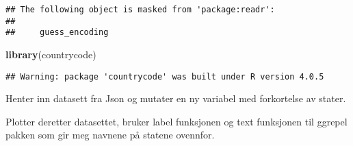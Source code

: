 \documentclass[
]{article}
\newenvironment{Shaded}{\begin{snugshade}}{\end{snugshade}}
\newcommand{\DataTypeTok}[1]{\textcolor[rgb]{0.13,0.29,0.53}{#1}}
\newcommand{\KeywordTok}[1]{\textcolor[rgb]{0.13,0.29,0.53}{\textbf{#1}}}
\newcommand{\NormalTok}[1]{#1}
\newcommand{\OperatorTok}[1]{\textcolor[rgb]{0.81,0.36,0.00}{\textbf{#1}}}
\newcommand{\StringTok}[1]{\textcolor[rgb]{0.31,0.60,0.02}{#1}}
\begin{document}
\begin{verbatim}
## The following object is masked from 'package:readr':
## 
##     guess_encoding
\end{verbatim}

\begin{Shaded}
\begin{Highlighting}[]
\KeywordTok{library}\NormalTok{(countrycode)}
\end{Highlighting}
\end{Shaded}

\begin{verbatim}
## Warning: package 'countrycode' was built under R version 4.0.5
\end{verbatim}

Henter inn datasett fra Json og mutater en ny variabel med forkortelse
av stater.

\begin{Shaded}
\end{Shaded}

Plotter deretter datasettet, bruker label funksjonen og text funksjonen
til ggrepel pakken som gir meg navnene på statene ovennfor.
\end{document}
